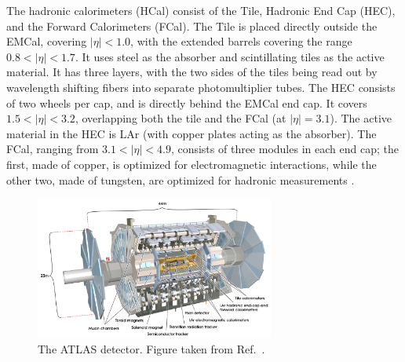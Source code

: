 The hadronic calorimeters (HCal) consist of the Tile, Hadronic End Cap (HEC), and the Forward Calorimeters (FCal). The Tile is placed directly outside the EMCal, covering $|\eta| < 1.0$, with the extended barrels covering the range $0.8 <|\eta|< 1.7$. It uses steel as the absorber and scintillating tiles as the active material. It has three layers, with the two sides of the tiles being read out by wavelength shifting fibers into separate photomultiplier tubes. The HEC consists of two wheels per cap, and is directly behind the EMCal end cap. It covers $1.5< |\eta| < 3.2$, overlapping both the tile and the FCal (at $|\eta| =  3.1$). The active material in the HEC is LAr (with copper plates acting as the absorber). The FCal, ranging from $3.1 < |\eta| < 4.9$, consists of three modules in each end cap; the first, made of copper, is optimized for electromagnetic interactions, while the other two, made of tungsten, are optimized for hadronic measurements \cite{Aad:2008zzm}.

\begin{figure}[ht]
	\centering
	\includegraphics[width=0.7\textwidth]{figures/atlas.pdf} %
	\caption{The ATLAS detector. Figure taken from Ref.~\cite{Aad:2008zzm}.}	
	\label{fig:atlas}%
\end{figure}

